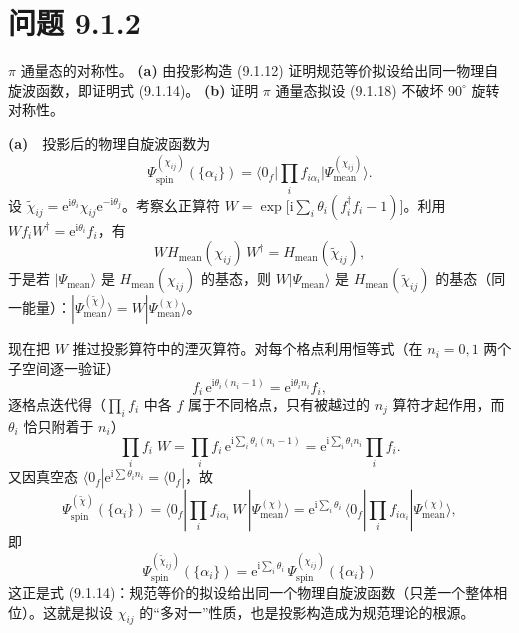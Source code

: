\section*{问题 9.1.2}
\begin{problem}
$\pi$ 通量态的对称性。
\textbf{(a)} 由投影构造 (9.1.12) 证明规范等价拟设给出同一物理自旋波函数，即证明式 (9.1.14)。
\textbf{(b)} 证明 $\pi$ 通量态拟设 (9.1.18) 不破坏 $90^{\circ}$ 旋转对称性。
\end{problem}
\solution
\textbf{(a)}　投影后的物理自旋波函数为
\begin{equation*}
\Psi^{(\chi_{ij})}_{\text{spin}}(\{\alpha_i\})=\langle 0_f|\prod_i f_{i\alpha_i}\big|\Psi^{(\chi_{ij})}_{\text{mean}}\rangle .
\end{equation*}
设 $\tilde{\chi}_{ij}=\mathrm{e}^{\mathrm{i}\theta_i}\chi_{ij}\mathrm{e}^{-\mathrm{i}\theta_j}$。考察幺正算符 $W=\exp\big[\mathrm{i}\sum_i\theta_i(f^{\dagger}_if_i-1)\big]$。利用 $Wf_iW^{\dagger}=\mathrm{e}^{\mathrm{i}\theta_i}f_i$，有
\begin{equation*}
W H_{\text{mean}}(\chi_{ij})\,W^{\dagger}=H_{\text{mean}}(\tilde{\chi}_{ij}),
\end{equation*}
于是若 $|\Psi_{\text{mean}}\rangle$ 是 $H_{\text{mean}}(\chi_{ij})$ 的基态，则 $W|\Psi_{\text{mean}}\rangle$ 是 $H_{\text{mean}}(\tilde{\chi}_{ij})$ 的基态（同一能量）：$|\Psi^{(\tilde{\chi})}_{\text{mean}}\rangle=W|\Psi^{(\chi)}_{\text{mean}}\rangle$。

现在把 $W$ 推过投影算符中的湮灭算符。对每个格点利用恒等式（在 $n_i=0,1$ 两个子空间逐一验证）
\begin{equation*}
f_i\,\mathrm{e}^{\mathrm{i}\theta_i(n_i-1)}=\mathrm{e}^{\mathrm{i}\theta_i n_i}f_i ,
\end{equation*}
逐格点迭代得（$\prod_i f_i$ 中各 $f$ 属于不同格点，只有被越过的 $n_j$ 算符才起作用，而 $\theta_i$ 恰只附着于 $n_i$）
\begin{equation*}
\prod_i f_i\;W=\prod_i f_i\,\mathrm{e}^{\mathrm{i}\sum_i\theta_i(n_i-1)}=\mathrm{e}^{\mathrm{i}\sum_i\theta_i n_i}\prod_i f_i .
\end{equation*}
又因真空态 $\langle 0_f|\mathrm{e}^{\mathrm{i}\sum\theta_in_i}=\langle 0_f|$，故
\begin{equation*}
\Psi^{(\tilde{\chi})}_{\text{spin}}(\{\alpha_i\})
=\langle 0_f|\prod_if_{i\alpha_i}\,W\,|\Psi^{(\chi)}_{\text{mean}}\rangle
=\mathrm{e}^{\mathrm{i}\sum_i\theta_i}\,\langle 0_f|\prod_if_{i\alpha_i}|\Psi^{(\chi)}_{\text{mean}}\rangle ,
\end{equation*}
即
\begin{equation*}
\boxed{\;\Psi^{(\tilde{\chi}_{ij})}_{\text{spin}}(\{\alpha_i\})=\mathrm{e}^{\mathrm{i}\sum_i\theta_i}\,\Psi^{(\chi_{ij})}_{\text{spin}}(\{\alpha_i\})\;}
\end{equation*}
这正是式 (9.1.14)：规范等价的拟设给出同一个物理自旋波函数（只差一个整体相位）。这就是拟设 $\chi_{ij}$ 的“多对一”性质，也是投影构造成为规范理论的根源。

